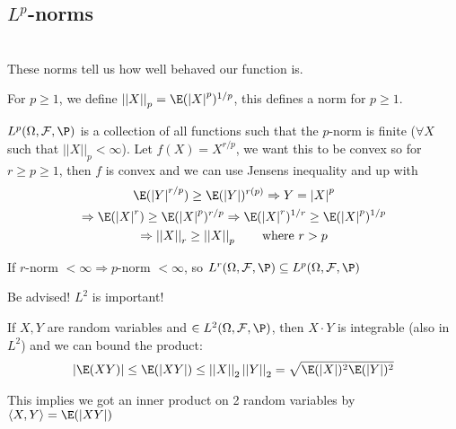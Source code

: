 \subsection{$L^p$-norms}\hfill\\
\noindent These norms tell us how well behaved our function is.\par
\noindent For $p\geq1$, we define $\left|\left|X\right|\right|_p = \E(\left|X\right|^p)^{1/p}$, this defines a norm for $p\geq 1$.
\par\bigskip
\noindent $L^p(\Omega,\mathcal{F},\P)$ is a collection of all functions such that the $p$-norm is finite ($\forall X$ such that $\left|\left|X\right|\right|_p<\infty$). Let $f(X) = X^{r/p}$, we want this to be convex so for $r\geq p\geq1$, then $f$ is convex and we can use Jensens inequality and up with 
\begin{equation*}
  \begin{gathered}
    \E(\left|Y\right|^{r/p})\geq \E(\left|Y\right|)^{r(p)}\Rightarrow Y=\left|X\right|^p\\
    \Rightarrow \E(\left|X\right|^r)\geq \E(\left|X\right|^p)^{r/p}\Rightarrow \E(\left|X\right|^r)^{1/r}\geq \E(\left|X\right|^p)^{1/p}\\
    \Rightarrow \left|\left|X\right|\right|_r\geq\left|\left|X\right|\right|_p\qquad\text{where $r>p$}
  \end{gathered}
\end{equation*}\par
\noindent If $r$-norm $<\infty\Rightarrow p$-norm $<\infty$, so $L^r(\Omega, \mathcal{F},\P)\subseteq L^p(\Omega, \mathcal{F},\P)$
\par\bigskip
\noindent Be advised! $L^2$ is important!
\par\bigskip
\begin{defo}{}
  If $X,Y$ are random variables and $\in L^2(\Omega, \mathcal{F},\P)$, then $X\cdot Y$ is integrable (also in $L^2$) and we can bound the product:
  \begin{equation*}
    \begin{gathered}
      \left|\E(XY)\right|\leq \E(\left|XY\right|)\leq \left|\left|X\right|\right|_2\left|\left|Y\right|\right|_2 = \sqrt{\E(\left|X\right|)^2\E(\left|Y\right|)^2}
    \end{gathered}
  \end{equation*}
  \par\bigskip
  \noindent This implies we got an inner product on 2 random variables by $\langle X,Y\rangle = \E(\left|XY\right|)$
\end{defo}
